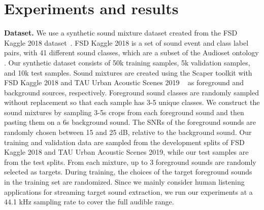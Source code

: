 \section{Experiments and results}








{\bf Dataset.} We use a synthetic sound mixture dataset created from the  FSD Kaggle 2018 dataset~\cite{Fonseca2018_DCASE}. FSD Kaggle 2018 is a set of sound event and class label pairs, with 41 different sound classes, which are a subset of the Audioset ontology \cite{gemmeke2017audio}. Our synthetic dataset consists of 50k training samples, 5k validation samples, and 10k test samples. {Sound mixtures are created using the Scaper toolkit \cite{8170052} with FSD Kaggle 2018 and TAU Urban Acoustic Scenes 2019 ~\cite{Mesaros2018_DCASE} as foreground and background sources, respectively}. Foreground sound classes are randomly sampled without replacement so that each sample has 3-5 unique classes. We construct the sound mixtures by sampling 3-5s crops from each foreground sound and then pasting them on a 6s background sound. The SNRs of the foreground sounds are randomly chosen between 15 and 25 dB, relative to the background sound. Our training and validation data are sampled from the development splits of FSD Kaggle 2018 and TAU Urban Acoustic Scenes 2019, while our test samples are  from the test splits.
From each mixture, up to 3 foreground sounds are randomly selected as targets.
During training, the choices of the target foreground sounds in the training set are randomized. Since we mainly consider human listening applications for streaming target sound extraction, we run  our experiments at a 44.1 kHz  sampling rate  to cover the full audible range.










